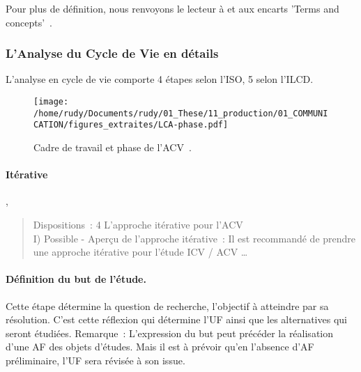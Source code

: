 Pour plus de définition, nous renvoyons le lecteur à  et aux encarts 'Terms and concepts'~\cite{european_commission_ilcd_2010}.

\subsubsection{L'Analyse du Cycle de Vie en détails}
L'analyse en cycle de vie comporte 4 étapes selon l'\gls{ISO}, 5 selon l'\gls{ILCD}.
\begin{figure}
\centering
\texttt{[image: /home/rudy/Documents/rudy/01\_These/11\_production/01\_COMMUNICATION/figures\_extraites/LCA-phase.pdf]}
\caption{Cadre de travail et phase de l'ACV~\cite{european_commission_ilcd_2010}.}
\label{fig:LCA-phase}
\end{figure}
\paragraph{Itérative},
\blockcquote[]{european_commission_ilcd_2010}{
Dispositions~: 4 L'approche itérative pour l'ACV\\
I) Possible - Aperçu de l'approche itérative~: Il est recommandé de prendre une approche itérative pour l'étude ICV / ACV%
\ldots
}
\paragraph{Définition du but de l'étude.}
Cette étape détermine la question de recherche, l'objectif à atteindre par sa résolution.
C'est cette réflexion qui détermine l'\gls{UF} ainsi que les alternatives qui seront étudiées.
Remarque~: L'expression du but peut précéder la réalisation d'une \gls{AF} des objets d'études.
Mais il est à prévoir qu'en l'absence d'\gls{AF} préliminaire, l'\gls{UF} sera révisée à son issue.
